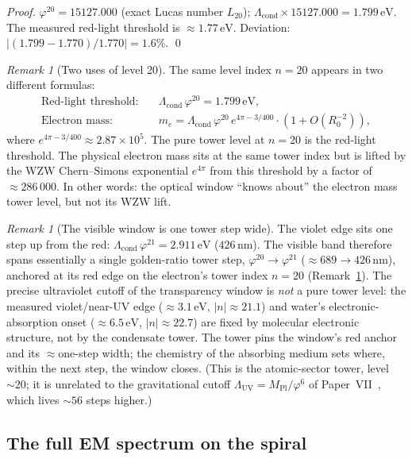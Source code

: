 \documentclass[11pt,a4paper]{article}
\theoremstyle{definition}
\theoremstyle{remark}
\newtheorem{remark}[theorem]{Remark}
\newcommand{\vp}{\varphi}
\newcommand{\Lcond}{\Lambda_{\mathrm{cond}}}
\newcommand{\LUV}{\Lambda_{\mathrm{UV}}}
\newcommand{\MPl}{M_{\mathrm{Pl}}}
\begin{document}
\begin{proof}
$\vp^{20} = 15127.000$ (exact Lucas number $L_{20}$);
$\Lcond\times 15127.000 = 1.799\,\mathrm{eV}$.
The measured red-light threshold is $\approx 1.77\,\mathrm{eV}$.
Deviation: $|(1.799-1.770)/1.770| = 1.6\%$.
\qed
\end{proof}

\begin{remark}[Two uses of level 20]
\label{P11:rem:level20_dual_use}
The same level index $n=20$ appears in two different formulas:
\begin{align}
  \text{Red-light threshold:} &\quad \Lcond\,\vp^{20} = 1.799\,\mathrm{eV}, \\
  \text{Electron mass:} &\quad m_e = \Lcond\,\vp^{20}\,e^{4\pi-3/400}\cdot(1+O(R_0^{-2})),
\end{align}
where $e^{4\pi-3/400} \approx 2.87\times10^5$.
The pure tower level at $n=20$ is the red-light threshold.
The physical electron mass sits at the same tower index but is lifted
by the WZW Chern--Simons exponential $e^{4\pi}$ from this threshold
by a factor of $\approx 286\,000$.
In other words: the optical window ``knows about'' the electron mass
tower level, but not its WZW lift.
\end{remark}

\begin{remark}[The visible window is one tower step wide]
\label{P11:rem:visible_window}
The violet edge sits one step up from the red: $\Lcond\,\vp^{21}=2.911\,\mathrm{eV}$
($426\,\mathrm{nm}$). The visible band therefore spans essentially a single
golden-ratio tower step, $\vp^{20}\!\to\!\vp^{21}$ ($\approx689\!\to\!426\,\mathrm{nm}$),
anchored at its red edge on the electron's tower index $n=20$
(Remark~\ref{P11:rem:level20_dual_use}). The precise ultraviolet cutoff of the
transparency window is \emph{not} a pure tower level: the measured violet/near-UV
edge ($\approx3.1\,\mathrm{eV}$, $|n|\approx21.1$) and water's electronic-absorption
onset ($\approx6.5\,\mathrm{eV}$, $|n|\approx22.7$) are fixed by molecular electronic
structure, not by the condensate tower. The tower pins the window's red anchor and
its $\approx$one-step width; the chemistry of the absorbing medium sets where,
within the next step, the window closes. (This is the atomic-sector tower, level
$\sim20$; it is unrelated to the gravitational cutoff $\LUV=\MPl/\vp^6$ of
Paper~VII~\cite{Paper7}, which lives $\sim56$ steps higher.)
\end{remark}

\subsection{The full EM spectrum on the spiral}
\end{document}
